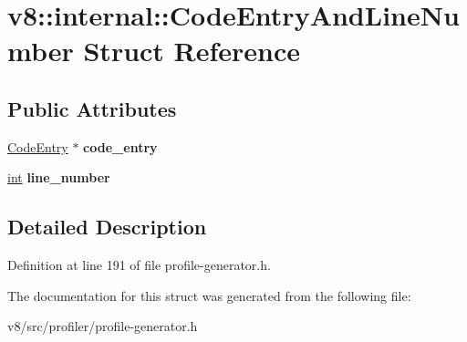 \hypertarget{structv8_1_1internal_1_1CodeEntryAndLineNumber}{}\section{v8\+:\+:internal\+:\+:Code\+Entry\+And\+Line\+Number Struct Reference}
\label{structv8_1_1internal_1_1CodeEntryAndLineNumber}
\subsection*{Public Attributes}
\begin{DoxyCompactItemize}
\item 
\mbox{\label{structv8_1_1internal_1_1CodeEntryAndLineNumber_a9d124c0f97c9f6fdb6e5c9d3c301c816}} 
\mbox{\hyperlink{classv8_1_1internal_1_1CodeEntry}{Code\+Entry}} $\ast$ {\bfseries code\+\_\+entry}
\item 
\mbox{\label{structv8_1_1internal_1_1CodeEntryAndLineNumber_a243ce0b48ac968b6d242a81e7efec326}} 
\mbox{\hyperlink{classint}{int}} {\bfseries line\+\_\+number}
\end{DoxyCompactItemize}


\subsection{Detailed Description}


Definition at line 191 of file profile-\/generator.\+h.



The documentation for this struct was generated from the following file\+:\begin{DoxyCompactItemize}
\item 
v8/src/profiler/profile-\/generator.\+h\end{DoxyCompactItemize}
